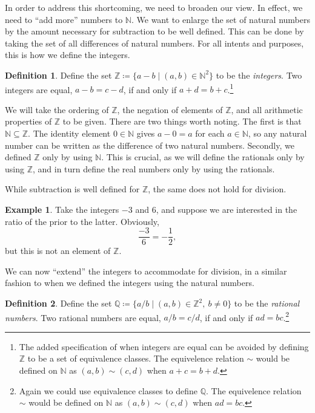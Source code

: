 \documentclass{article}
\newcommand{\N}{\mathbb{N}}
\newcommand{\Q}{\mathbb{Q}}
\newcommand{\Z}{\mathbb{Z}}
\theoremstyle{definition}
\newtheorem{definition}{Definition}[section]
\newtheorem{example}{Example}[section]
\begin{document}
In order to address this shortcoming, we need to broaden our view. In effect, we need to ``add more'' numbers to $ \N $. We want to enlarge the set of natural numbers by the amount necessary for subtraction to be well defined. This can be done by taking the set of all differences of natural numbers. For all intents and purposes, this is how we define the integers. 
\begin{definition}
	Define the set $ \Z\coloneqq\{a-b\mid(a,b)\in\N^2\} $ to be the \textit{\color{red}integers}. Two integers are equal, $ a-b=c-d $, if and only if $ a+d=b+c $.\footnote{The added specification of when integers are equal can be avoided by defining $ \Z $ to be a set of equivalence classes. The equivelence relation $ \sim $ would be defined on $ \N $ as $ (a,b)\sim(c,d) $ when $ a+c=b+d $.}  
\end{definition}
\noindent We will take the ordering of $ \Z $, the negation of elements of $ \Z $, and all arithmetic properties of $ \Z $ to be given. There are two things worth noting. The first is that $ \N\subseteq\Z $. The identity element $ 0\in\N $ gives $ a-0=a $ for each $ a\in\N $, so any natural number can be written as the difference of two natural numbers. Secondly, we defined $ \Z $ only by using $ \N $. This is crucial, as we will define the rationals only by using $ \Z $, and in turn define the real numbers only by using the rationals.

While subtraction is well defined for $ \Z $, the same does not hold for division. 
\begin{example}
 Take the integers $ -3 $ and 6, and suppose we are interested in the ratio of the prior to the latter. Obviously, $$ \frac{-3}{6}=-\frac{1}{2} ,$$ but this is not an element of $ \Z $. 
\end{example}
We can now ``extend'' the integers to accommodate for division, in a similar fashion to when we defined the integers using the natural numbers. 
\begin{definition}
	Define the set $ \Q\coloneqq\{a/b\mid(a,b)\in\Z^2,\ b\neq0\} $ to be the \textit{\color{red}rational numbers}. Two rational numbers are equal, $ a/b=c/d $, if and only if $ ad=bc $.\footnote{Again we could use equivalence classes to define $ \Q $. The equivelence relation $ \sim $ would be defined on $ \N $ as $ (a,b)\sim(c,d) $ when $ ad=bc $.}  
\end{definition}
\end{document}
